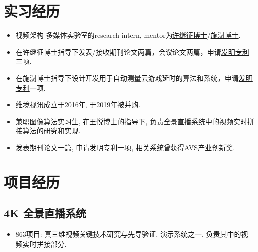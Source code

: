 \documentclass{resume}
\begin{document}
\section{实习经历}
\begin{itemize}
   \item 视频架构-多媒体实验室的research intern, mentor为\href{https://scholar.google.com/citations?user=x4iWZ7wAAAAJ&hl=en}{许继征博士}/\href{https://scholar.google.com/citations?hl=en&user=RQD_dqYAAAAJ}{施澍博士}.
  \item 在许继征博士指导下发表/接收期刊论文两篇，会议论文两篇，申请\href{http://www.soopat.com/Home/Result?Sort=&View=&Columns=&Valid=&Embed=&Db=&Ids=&FolderIds=&FolderId=&ImportPatentIndex=&Filter=&SearchWord=%E9%BB%8E%E5%90%89%E5%9B%BD&FMZL=Y&SYXX=Y&WGZL=Y&FMSQ=Y}{发明专利}三项.
  \item 在施澍博士指导下设计开发用于自动测量云游戏延时的算法和系统，申请\href{http://www.soopat.com/Patent/202110172567}{发明专利}一项.
\end{itemize}

\begin{itemize}
  \item 维境视讯成立于2016年, 于2019年被并购.
  \item 兼职图像算法实习生, 在\href{https://dblp.uni-trier.de/pid/33/4822-32.html}{王悦博士}的指导下, 负责全景直播系统中的视频实时拼接算法的研究和实现.
  \item 发表\href{https://kns.cnki.net/kcms/detail/detail.aspx?dbcode=CJFD&dbname=CJFDLAST2018&filename=PZKX201803003&v=tPaKZsLxkg0cUv5TgA0vLc%25mmd2B%25mmd2FYm0D6CGdqsd20qB21aAFkQVtxA1pTOQHC3je4lKJ}{期刊论文}一篇, 申请发明\href{http://www.soopat.com/Patent/201711100069}{专利}一项, 相关系统曾获得\href{http://www.avs.org.cn/avs_award/2017.asp}{AVS产业创新奖}.
\end{itemize}

\section{项目经历}
\subsection{4K 全景直播系统}
\begin{itemize}
  \item 863项目: 真三维视频关键技术研究与先导验证, 演示系统之一, 负责其中的视频实时拼接部分.
\end{itemize}
\end{document}
